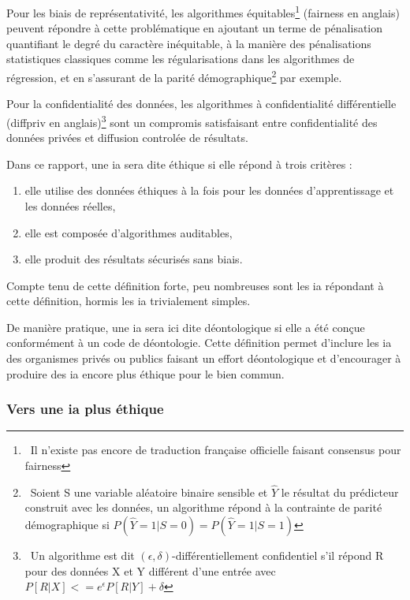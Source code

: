 Pour les biais de représentativité, les algorithmes équitables\footnote{~Il n'existe pas encore de traduction française officielle faisant consensus pour \gls{fairness}} (\gls{fairness} en anglais) peuvent répondre à cette problématique en ajoutant un terme de pénalisation quantifiant le degré du caractère inéquitable, à la manière des pénalisations statistiques classiques comme les régularisations dans les algorithmes de régression, et en s'assurant de la parité démographique\footnote{~Soient S une variable aléatoire binaire sensible et $\hat{Y}$ le résultat du prédicteur construit avec les données, un algorithme répond à la contrainte de parité démographique si $P(\hat{Y}=1|S=0)=P(\hat{Y}=1|S=1)$} par exemple. 

Pour la confidentialité des données, les algorithmes à confidentialité différentielle (\gls{diffpriv} en anglais)\footnote{~Un algorithme est dit $ (\epsilon,\delta)$-différentiellement confidentiel s'il répond R pour des données X et Y différent d'une entrée avec $P[R|X]<=e^\epsilon P[R|Y] + \delta$}  sont un compromis satisfaisant entre confidentialité des données privées et diffusion controlée de résultats.

Dans ce rapport, une \gls{ia} sera dite éthique si elle répond à trois critères : 
\begin{enumerate}
    \item elle utilise des données éthiques à la fois pour les données d'apprentissage et les données réelles,
    \item elle est composée d'algorithmes auditables,
    \item elle produit des résultats sécurisés sans biais.
\end{enumerate}

Compte tenu de cette définition forte, peu nombreuses sont les \gls{ia} répondant à cette définition, hormis les \gls{ia} trivialement simples.

De manière pratique, une \gls{ia} sera ici dite déontologique si elle a été conçue conformément à un code de déontologie. Cette définition permet d'inclure les \gls{ia} des organismes privés ou publics faisant un effort déontologique et d'encourager à produire des \gls{ia} encore plus éthique pour le bien commun.


\subsubsection{Vers une \gls{ia} plus éthique}


